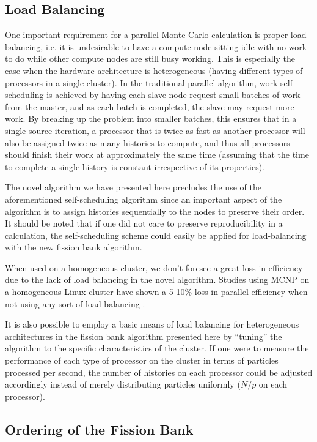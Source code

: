\subsection{Load Balancing}
\label{load-balancing}

One important requirement for a parallel Monte Carlo calculation is proper
load-balancing, i.e. it is undesirable to have a compute node sitting idle with
no work to do while other compute nodes are still busy working. This is
especially the case when the hardware architecture is heterogeneous (having
different types of processors in a single cluster). In the traditional parallel
algorithm, work self-scheduling is achieved by having each slave node request
small batches of work from the master, and as each batch is completed, the slave
may request more work. By breaking up the problem into smaller batches, this
ensures that in a single source iteration, a processor that is twice as fast as
another processor will also be assigned twice as many histories to compute, and
thus all processors should finish their work at approximately the same time
(assuming that the time to complete a single history is constant irrespective of
its properties).

The novel algorithm we have presented here precludes the use of the
aforementioned self-scheduling algorithm since an important aspect of the
algorithm is to assign histories sequentially to the nodes to preserve their
order. It should be noted that if one did not care to preserve reproducibility
in a calculation, the self-scheduling scheme could easily be applied for
load-balancing with the new fission bank algorithm.

When used on a homogeneous cluster, we don't foresee a great loss in efficiency
due to the lack of load balancing in the novel algorithm. Studies using MCNP on
a homogeneous Linux cluster have shown a 5-10\% loss in parallel efficiency when
not using any sort of load balancing \cite{lanl-brown-2005}.

It is also possible to employ a basic means of load balancing for heterogeneous
architectures in the fission bank algorithm presented here by ``tuning'' the
algorithm to the specific characteristics of the cluster. If one were to measure
the performance of each type of processor on the cluster in terms of particles
processed per second, the number of histories on each processor could be
adjusted accordingly instead of merely distributing particles uniformly ($N/p$
on each processor).

\subsection{Ordering of the Fission Bank}


